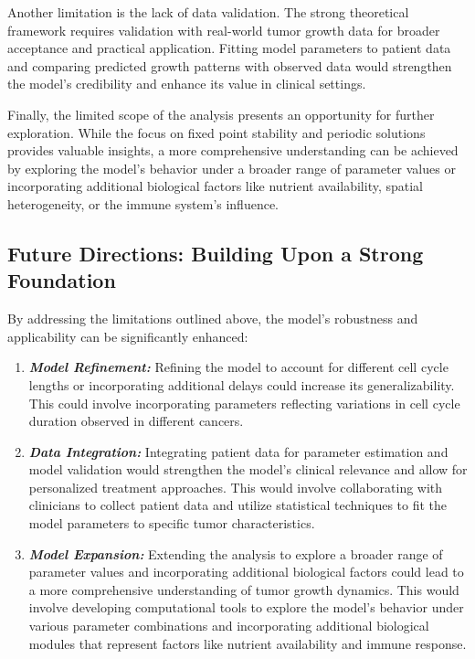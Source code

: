 Another limitation is the lack of data validation. The strong theoretical framework requires validation with real-world tumor growth data for broader acceptance and practical application. Fitting model parameters to patient data and comparing predicted growth patterns with observed data would strengthen the model's credibility and enhance its value in clinical settings.

Finally, the limited scope of the analysis presents an opportunity for further exploration. While the focus on fixed point stability and periodic solutions provides valuable insights, a more comprehensive understanding can be achieved by exploring the model's behavior under a broader range of parameter values or incorporating additional biological factors like nutrient availability, \gls{spatial heterogeneity}, or the immune system's influence.

\subsection{Future Directions: Building Upon a Strong Foundation}

By addressing the limitations outlined above, the model's robustness and applicability can be significantly enhanced:

\begin{enumerate}
    \item \textbf{\textit{Model Refinement:}} Refining the model to account for different cell cycle lengths or incorporating additional delays could increase its generalizability. This could involve incorporating parameters reflecting variations in cell cycle duration observed in different cancers.
    \item \textbf{\textit{Data Integration:}} Integrating patient data for parameter estimation and model validation would strengthen the model's clinical relevance and allow for personalized treatment approaches. This would involve collaborating with clinicians to collect patient data and utilize statistical techniques to fit the model parameters to specific tumor characteristics.
    \item \textbf{\textit{Model Expansion:}} Extending the analysis to explore a broader range of parameter values and incorporating additional biological factors could lead to a more comprehensive understanding of tumor growth dynamics. This would involve developing computational tools to explore the model's behavior under various parameter combinations and incorporating additional biological modules that represent factors like nutrient availability and immune response.
\end{enumerate}


